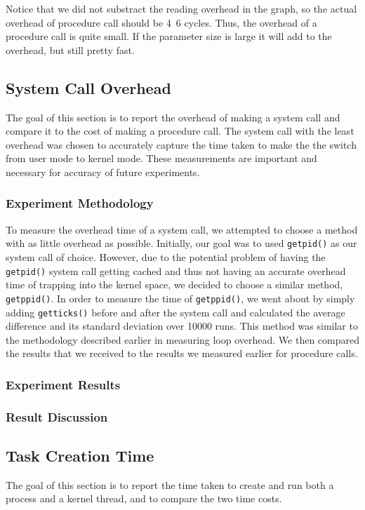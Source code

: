 \documentclass{article} %
\begin{document}
Notice that we did not substract the reading overhead in the graph, so the
actual overhead of procedure call should be 4~6 cycles. Thus, the overhead of
a procedure call is quite small. If the parameter size is large it will add to
the overhead, but still pretty fast.

\subsection{System Call Overhead}
The goal of this section is to report the overhead of making a system call and
compare it to the cost of making a procedure call. The system call with the
least overhead was chosen to accurately capture the time taken to make the the
switch from user mode to kernel mode. These measurements are important and
necessary for accuracy of future experiments.

\subsubsection{Experiment Methodology}
To measure the overhead time of a system call, we attempted to choose a method
with as little overhead as possible. Initially, our goal was to used
\texttt{getpid()} as our system call of choice. However, due to the potential
problem of having the \texttt{getpid()} system call getting cached and thus
not having an accurate overhead time of trapping into the kernel space, we
decided to choose a similar method, \texttt{getppid()}. In order to measure
the time of \texttt{getppid()}, we went about by simply adding
\texttt{getticks()} before and after the system call and calculated the
average difference and its standard deviation over 10000 runs. This method was
similar to the methodology described earlier in measuring loop overhead. We
then compared the results that we received to the results we measured earlier
for procedure calls.

\subsubsection{Experiment Results}

\subsubsection{Result Discussion}

\subsection{Task Creation Time}
The goal of this section is to report the time taken to create and run both
a process and a kernel thread, and to compare the two time costs.
\end{document}
